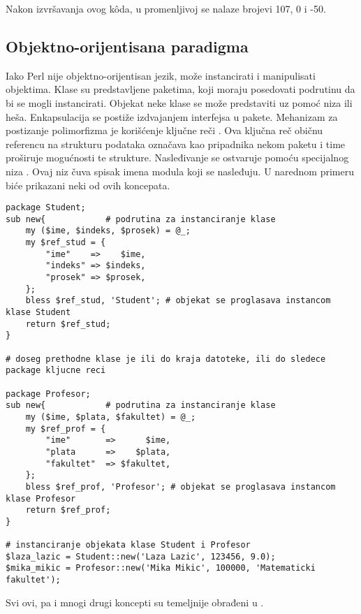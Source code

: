 \documentclass[a4paper]{article}
\begin{document}
Nakon izvršavanja ovog k\^{o}da, u promenljivoj  se nalaze brojevi 107, 0 i -50. 


\subsection{Objektno-orijentisana paradigma}

Iako Perl nije objektno-orijentisan jezik, može instancirati i manipulisati objektima. Klase su predstavljene paketima, koji moraju posedovati  podrutinu da bi se mogli instancirati. Objekat neke klase se može predstaviti uz pomoć niza ili heša. Enkapsulacija se postiže izdvajanjem interfejsa u pakete. Mehanizam za postizanje polimorfizma je korišćenje ključne reči . Ova ključna reč običnu referencu na strukturu podataka označava kao pripadnika nekom paketu i time proširuje mogućnosti te strukture. Nasleđivanje se ostvaruje pomoću specijalnog niza . Ovaj niz čuva spisak imena modula koji se nasleđuju. U narednom primeru biće prikazani neki od ovih koncepata.

\begin{lstlisting}[caption={Objektno orijentisana paradigma u Perlu}, frame=single, label = objPerl]
package Student;    
sub new{            # podrutina za instanciranje klase
    my ($ime, $indeks, $prosek) = @_;
    my $ref_stud = {
        "ime"    =>    $ime,
        "indeks" => $indeks,
        "prosek" => $prosek,
    };
    bless $ref_stud, 'Student'; # objekat se proglasava instancom klase Student
    return $ref_stud;
}

# doseg prethodne klase je ili do kraja datoteke, ili do sledece package kljucne reci

package Profesor;
sub new{            # podrutina za instanciranje klase
    my ($ime, $plata, $fakultet) = @_;
    my $ref_prof = {
        "ime"       =>      $ime,
        "plata      =>    $plata,
        "fakultet"  => $fakultet,
    };
    bless $ref_prof, 'Profesor'; # objekat se proglasava instancom klase Profesor
    return $ref_prof;
}

# instanciranje objekata klase Student i Profesor
$laza_lazic = Student::new('Laza Lazic', 123456, 9.0);
$mika_mikic = Profesor::new('Mika Mikic', 100000, 'Matematicki fakultet');

\end{lstlisting}

Svi ovi, pa i mnogi drugi koncepti su temeljnije obrađeni u \cite{Srinivasan:1997:APP:549810}.
\end{document}

